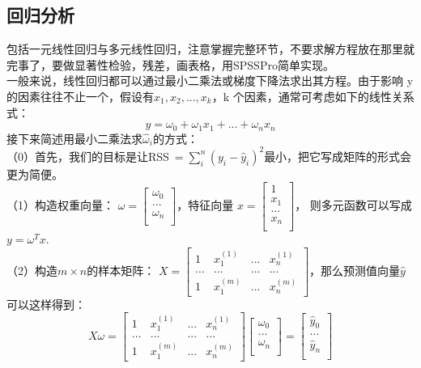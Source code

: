 \documentclass[11pt,a4paper]{article}
\begin{document}
\subsection{回归分析}
包括一元线性回归与多元线性回归，注意掌握完整环节，不要求解方程放在那里就完事了，要做显著性检验，残差，画表格，用SPSSPro简单实现。\\
\indent\setlength{\parindent}{2em}一般来说，线性回归都可以通过最小二乘法或梯度下降法求出其方程。由于影响 y 的因素往往不止一个，假设有$x_1,x_2,...,x_k$，k 个因素，通常可考虑如下的线性关系式：\\
\begin{equation*}
	y=\omega_0+\omega_1x_1+...+\omega_nx_n
\end{equation*}
接下来简述用最小二乘法求$\hat \omega_i$的方式：\\
（0）首先，我们的目标是让RSS$\ =\sum\limits_{i}^{n}(y_i-\hat y_i)^2$最小，把它写成矩阵的形式会更为简便。\\
（1）构造权重向量：
$\omega=\begin{bmatrix}
	\omega_0\\
	...\\
	\omega_n\\
\end{bmatrix}$，特征向量
$x=\begin{bmatrix}
	1\\
	x_1\\
	...\\
	x_n\\
\end{bmatrix}$，
则多元函数可以写成$y=\omega^Tx$.\\
（2）构造$m\times n$的样本矩阵：
$X=\begin{bmatrix}
	1 & x_1^{(1)} & ... & x_n^{(1)}\\
	... & ... & ... &...\\
	1 & x_1^{(m)} & ... & x_n^{(m)}
\end{bmatrix}$，那么预测值向量$\hat y$可以这样得到：\\
\begin{equation*}
	X\omega=\begin{bmatrix}
		1 & x_1^{(1)} & ... & x_n^{(1)}\\
		... & ... & ... &...\\
		1 & x_1^{(m)} & ... & x_n^{(m)}
	\end{bmatrix}
	\begin{bmatrix}
		\omega_0\\
		...\\
		\omega_n\\
	\end{bmatrix}
	=\begin{bmatrix}
		\hat y_0\\
		...\\
		\hat y_n\\
	\end{bmatrix}
\end{equation*}
\end{document}
